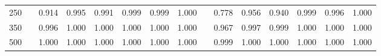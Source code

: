 % 
\begin{tabular}{ccccccccccccccc}
  \hline
  \hline
250 &  & 0.914 & 0.995 & 0.991 & 0.999 & 0.999 & 1.000 &  & 0.778 & 0.956 & 0.940 & 0.999 & 0.996 & 1.000 \\ 
  350 &  & 0.996 & 1.000 & 1.000 & 1.000 & 1.000 & 1.000 &  & 0.967 & 0.997 & 0.999 & 1.000 & 1.000 & 1.000 \\ 
  500 &  & 1.000 & 1.000 & 1.000 & 1.000 & 1.000 & 1.000 &  & 0.999 & 1.000 & 1.000 & 1.000 & 1.000 & 1.000 \\ 
   \hline
\end{tabular}
